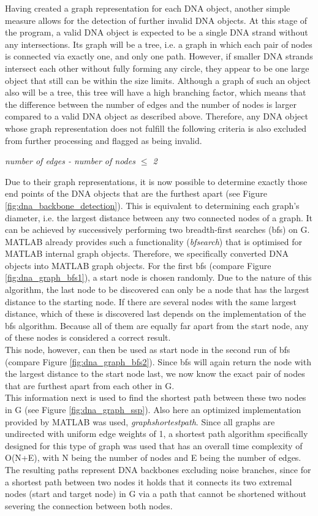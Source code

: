 \documentclass{article}
\begin{document}
Having created a graph representation for each DNA object, another simple measure allows for the detection of further invalid DNA objects. At this stage of the program, a valid DNA object is expected to be a single DNA strand without any intersections. Its graph will be a tree, i.e. a graph in which each pair of nodes is connected via exactly one, and only one path. However, if smaller DNA strands intersect each other without fully forming any circle, they appear to be one large object that still can be within the size limits. Although a graph of such an object also will be a tree, this tree will have a high branching factor, which means that the difference between the number of edges and the number of nodes is larger compared to a valid DNA object as described above. Therefore, any DNA object whose graph representation does not fulfill the following criteria is also excluded from further processing and flagged as being invalid.
\begin{center}\textit{number of edges - number of nodes $\leq$ 2}\end{center}
Due to their graph representations, it is now possible to determine exactly those end points of the DNA objects that are the furthest apart (see Figure \ref{fig:dna_backbone_detection}). This is equivalent to determining each graph's diameter, i.e. the largest distance between any two connected nodes of a graph. It can be achieved by successively performing two breadth-first searches (bfs) on G. MATLAB already provides such a functionality (\textit{bfsearch}) that is optimised for MATLAB internal graph objects. Therefore, we specifically converted DNA objects into MATLAB graph objects. For the first bfs (compare Figure \ref{fig:dna_graph_bfs1}), a start node is chosen randomly. Due to the nature of this algorithm, the last node to be discovered can only be a node that has the largest distance to the starting node. If there are several nodes with the same largest distance, which of these is discovered last depends on the implementation of the bfs algorithm. Because all of them are equally far apart from the start node, any of these nodes is considered a correct result.\\
This node, however, can then be used as start node in the second run of bfs (compare Figure \ref{fig:dna_graph_bfs2}). Since bfs will again return the node with the largest distance to the start node last, we now know the exact pair of nodes that are furthest apart from each other in G.\\
This information next is used to find the shortest path between these two nodes in G (see Figure \ref{fig:dna_graph_ssp}). Also here an optimized implementation provided by MATLAB was used, \textit{graphshortestpath}. Since all graphs are undirected with uniform edge weights of 1, a shortest path algorithm specifically designed for this type of graph was used that has an overall time complexity of O(N+E), with N being the number of nodes and E being the number of edges.
The resulting paths represent DNA backbones excluding noise branches, since for a shortest path between two nodes it holds that it connects its two extremal nodes (start and target node) in G via a path that cannot be shortened without severing the connection between both nodes.
\end{document}
